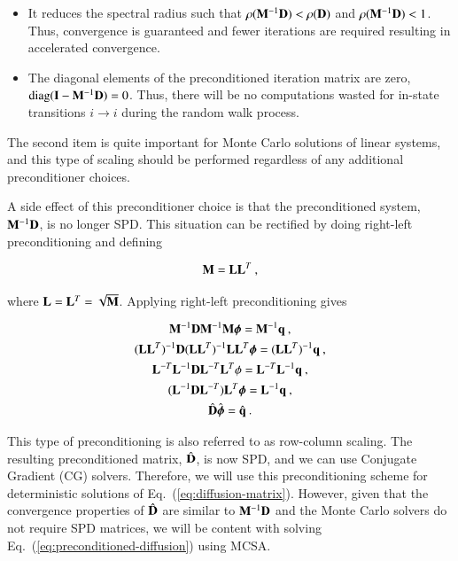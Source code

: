 \documentclass[preprint,12pt]{elsarticle}
\newcommand{\vI}{\ensuremath{\ve{I}}}
\newcommand{\bphi}{\ensuremath{\boldsymbol{\phi}}}
\DeclareMathOperator{\diag}{diag}
\begin{document}
\begin{itemize}
\item It reduces the spectral radius such that
  $\rho(\mathbf{M}^{-1}\mathbf{D}) < \rho(\mathbf{D})$ and
  $\rho(\mathbf{M}^{-1}\mathbf{D}) < 1$.  Thus, convergence is guaranteed and
  fewer iterations are required resulting in accelerated convergence.
\item The diagonal elements of the preconditioned iteration matrix are
  zero, $\diag(\vI - \ve{M}^{-1}\ve{D}) = 0$.  Thus, there will be no
  computations wasted for in-state transitions $i\rightarrow i$ during
  the random walk process.
\end{itemize}

The second item is quite important for Monte Carlo solutions of linear
systems, and this type of scaling should be performed regardless of
any additional preconditioner choices.

A side effect of this preconditioner choice is that the preconditioned
system, $\mathbf{M}^{-1}\mathbf{D}$, is no longer SPD.  This situation can be
rectified by doing right-left preconditioning and defining

\begin{equation}
  \mathbf{M} = \mathbf{L}\mathbf{L}^{T}\:,
\end{equation}

where $\mathbf{L} = \mathbf{L}^{T} = \sqrt{\mathbf{M}}$.  Applying right-left
preconditioning gives

\begin{equation}
  \begin{gathered}
    \ve{M}^{-1}\ve{D}\ve{M}^{-1}\ve{M}\bphi =
    \ve{M}^{-1}\ve{q}\:,\\ (\ve{LL}^T)^{-1}\ve{D}(\ve{LL}^T)^{-1}\ve{LL}^T\bphi
    = (\ve{LL}^T)^{-1}\ve{q}\:,
    \\ \ve{L}^{-T}\ve{L}^{-1}\ve{D}\ve{L}^{-T}\ve{L}^T\phi =
    \ve{L}^{-T}\ve{L}^{-1}\ve{q}\:,\\ (\ve{L}^{-1}\ve{D}\ve{L}^{-T})\ve{L}^T\bphi
    = \ve{L}^{-1}\ve{q}\:,\\ \hat{\ve{D}}\hat{\bphi} = \hat{\ve{q}}\:.
  \end{gathered}
  \label{eq:right-left-preconditioning}
\end{equation}

This type of preconditioning is also referred to as row-column
scaling.  The resulting preconditioned matrix, $\hat{\mathbf{D}}$, is now
SPD, and we can use Conjugate Gradient (CG) solvers.  Therefore, we
will use this preconditioning scheme for deterministic solutions of
Eq.~(\ref{eq:diffusion-matrix}).  However, given that the convergence
properties of $\hat{\mathbf{D}}$ are similar to $\mathbf{M}^{-1}\mathbf{D}$ and
the Monte Carlo solvers do not require SPD matrices, we will be
content with solving Eq.~(\ref{eq:preconditioned-diffusion}) using
MCSA.
\end{document}
